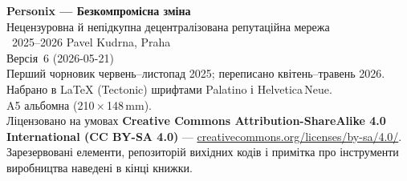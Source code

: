 \thispagestyle{empty}
\ifdefined\printmode\vspace*{\fill}\else{}\fi
\begin{flushleft}\small\sffamily
\textbf{Personix --- Безкомпромісна зміна}\\[0.3em]
Нецензуровна й непідкупна децентралізована репутаційна мережа\\[1.4em]

\textcopyright\ 2025--2026 Pavel Kudrna, Praha\\[0.4em]

Версія~6 (2026-05-21)\\
Перший чорновик червень--листопад 2025; переписано квітень--травень 2026.\\[1.4em]

Набрано в \LaTeX{} (Tectonic) шрифтами Palatino і Helvetica\,Neue.\\
A5 альбомна (210\,$\times$\,148\,mm).\\[1.4em]

Ліцензовано на умовах \textbf{Creative Commons Attribution-ShareAlike 4.0
International (CC BY-SA 4.0)} ---
\href{https://creativecommons.org/licenses/by-sa/4.0/}{creativecommons.org/licenses/by-sa/4.0/}.
Зарезервовані елементи, репозиторій вихідних кодів і примітка про інструменти
виробництва наведені в кінці книжки.
\end{flushleft}
\ifdefined\printmode\else{}\fi
\clearpage
